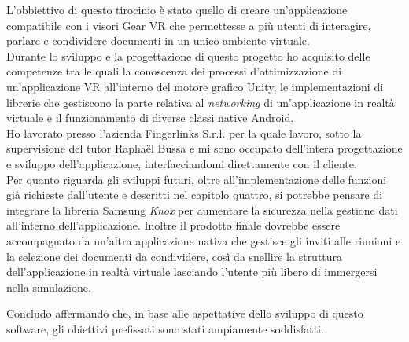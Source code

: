 L'obbiettivo di questo tirocinio è stato quello di creare un'applicazione compatibile con i visori Gear VR che permettesse a più utenti di interagire, parlare e condividere documenti in un unico ambiente virtuale.\\

Durante lo sviluppo e la progettazione di questo progetto ho acquisito delle competenze tra le quali la conoscenza dei processi d'ottimizzazione di un'applicazione VR all'interno del motore grafico Unity, le implementazioni di librerie che gestiscono la parte relativa al \textit{networking} di un'applicazione in realtà virtuale e il funzionamento di diverse classi native Android. \\

Ho lavorato presso l'azienda Fingerlinks S.r.l. per la quale lavoro, sotto la supervisione del tutor Raphaël Bussa e mi sono occupato dell'intera progettazione e sviluppo dell'applicazione, interfacciandomi direttamente con il cliente.\\

Per quanto riguarda gli sviluppi futuri, oltre all'implementazione delle funzioni già richieste dall'utente e descritti nel capitolo quattro, si potrebbe pensare di integrare la libreria Samsung \textit{Knox} per aumentare la sicurezza nella gestione dati all'interno dell'applicazione. Inoltre il prodotto finale dovrebbe essere accompagnato da un'altra applicazione nativa che gestisce gli inviti alle riunioni e la selezione dei documenti da condividere, così da snellire la struttura dell'applicazione in realtà virtuale lasciando l'utente più libero di immergersi nella simulazione.

Concludo affermando che, in base alle aspettative dello sviluppo di questo software, gli obiettivi prefissati sono stati ampiamente soddisfatti.